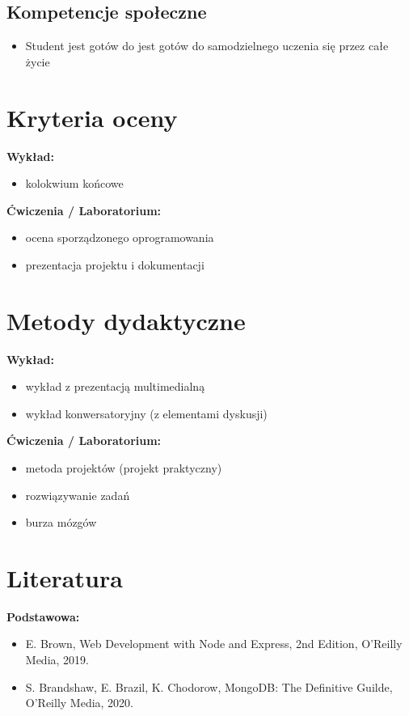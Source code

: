 \documentclass[12pt, a4paper]{article}
\begin{document}
\subsection*{Kompetencje społeczne}
\begin{itemize}
  \item Student jest gotów do jest gotów do samodzielnego uczenia się przez całe życie
\end{itemize}

\section{Kryteria oceny}

\textbf{Wykład:}
\begin{itemize}
  \item kolokwium końcowe
\end{itemize}
\vspace{4pt}
\textbf{Ćwiczenia / Laboratorium:}
\begin{itemize}
  \item ocena sporządzonego oprogramowania
  \item prezentacja projektu i dokumentacji
\end{itemize}


\section{Metody dydaktyczne}

\textbf{Wykład:}
\begin{itemize}
  \item wykład z prezentacją multimedialną
  \item wykład konwersatoryjny (z elementami dyskusji)
\end{itemize}
\vspace{4pt}
\textbf{Ćwiczenia / Laboratorium:}
\begin{itemize}
  \item metoda projektów (projekt praktyczny)
  \item rozwiązywanie zadań
  \item burza mózgów
\end{itemize}
\vspace{4pt}


\section{Literatura}

\textbf{Podstawowa:}
\begin{itemize}
  \item E. Brown, Web Development with Node and Express, 2nd Edition, O’Reilly Media, 2019.
  \item S. Brandshaw, E. Brazil, K. Chodorow, MongoDB: The Definitive Guilde, O’Reilly Media, 2020.
\end{itemize}
\end{document}
